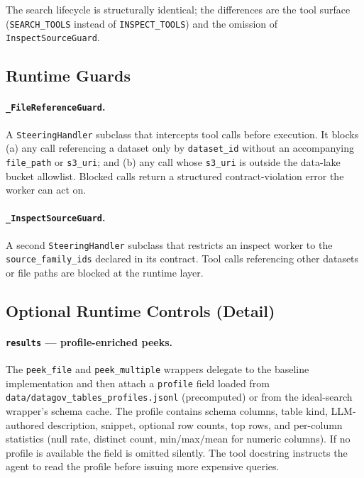 The search lifecycle is structurally identical; the differences are the tool surface (\texttt{SEARCH\_TOOLS} instead of \texttt{INSPECT\_TOOLS}) and the omission of \texttt{InspectSourceGuard}.

\subsection{Runtime Guards}

\paragraph{\texttt{\_FileReferenceGuard}.} A \texttt{SteeringHandler} subclass that intercepts tool calls before execution. It blocks (a) any call referencing a dataset only by \texttt{dataset\_id} without an accompanying \texttt{file\_path} or \texttt{s3\_uri}; and (b) any call whose \texttt{s3\_uri} is outside the data-lake bucket allowlist. Blocked calls return a structured contract-violation error the worker can act on.

\paragraph{\texttt{\_InspectSourceGuard}.} A second \texttt{SteeringHandler} subclass that restricts an inspect worker to the \texttt{source\_family\_ids} declared in its contract. Tool calls referencing other datasets or file paths are blocked at the runtime layer.

\subsection{Optional Runtime Controls (Detail)}

\paragraph{\texttt{results} --- profile-enriched peeks.} The \texttt{peek\_file} and \texttt{peek\_multiple} wrappers delegate to the baseline implementation and then attach a \texttt{profile} field loaded from \texttt{data/datagov\_tables\_profiles.jsonl} (precomputed) or from the ideal-search wrapper's schema cache. The profile contains schema columns, table kind, LLM-authored description, snippet, optional row counts, top rows, and per-column statistics (null rate, distinct count, min/max/mean for numeric columns). If no profile is available the field is omitted silently. The tool docstring instructs the agent to read the profile before issuing more expensive queries.

